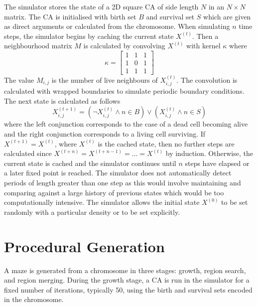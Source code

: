 The simulator stores the state of a 2D square CA of side length $N$ in an $N \times N$ matrix. The CA is initialised with birth set $B$ and survival set $S$ which are given as direct arguments or calculated from the chromosome. When simulating $n$ time steps, the simulator begins by caching the current state $X^{(t)}$. Then a neighbourhood matrix $M$ is calculated by convolving $X^{(t)}$ with kernel $\kappa$ where
\begin{equation}
    \kappa = \begin{bmatrix}
        1 & 1 & 1\\
        1 & 0 & 1\\
        1 & 1 & 1
        \end{bmatrix}    
\end{equation}
The value $M_{i,j}$ is the number of live neighbours of $X^{(t)}_{i,j}$. The convolution is calculated with wrapped boundaries to simulate periodic boundary conditions. The next state is calculated as follows
\begin{equation}
    X^{(t+1)}_{i,j}= (\lnot X^{(t)}_{i,j} \land n \in B) \lor (X^{(t)}_{i,j} \land n \in S)
\end{equation}
where the left conjunction corresponds to the case of a dead cell becoming alive and the right conjunction corresponds to a living cell surviving. If $X^{(t+1)} = X^{(t)}$, where $X^{(t)}$ is the cached state, then no further steps are calculated since $X^{(t + n)} = X^{(t + n - 1)} = ... = X^{(t)}$ by induction. Otherwise, the current state is cached and the simulator continues until $n$ steps have elapsed or a later fixed point is reached. The simulator does not automatically detect periods of length greater than one step as this would involve maintaining and comparing against a large history of previous states which would be too computationally intensive. The simulator allows the initial state $X^{(0)}$ to be set randomly with a particular density or to be set explicitly.\\

\section{Procedural Generation} \label{sec:proc-gen}
A maze is generated from a chromosome in three stages: growth, region search, and region merging. During the growth stage, a CA is run in the simulator for a fixed number of iterations, typically 50, using the birth and survival sets encoded in the chromosome. 


